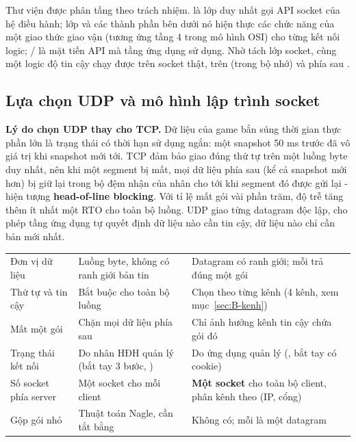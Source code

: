 Thư viện được phân tầng theo trách nhiệm.  là lớp duy nhất gọi API socket của hệ điều hành; lớp
 và các thành phần bên dưới nó hiện thực các chức năng của một giao thức giao vận (tương ứng tầng 4
trong mô hình OSI) cho từng kết nối logic; / là mặt tiền API mà tầng
ứng dụng sử dụng. Nhờ tách lớp socket, cùng một logic độ tin cậy chạy được trên socket thật, trên
 (trong bộ nhớ) và phía sau .

\subsection{Lựa chọn UDP và mô hình lập trình socket}
\textbf{Lý do chọn UDP thay cho TCP.} Dữ liệu của game bắn súng thời gian thực phần lớn là trạng thái có thời hạn
sử dụng ngắn: một snapshot 50 ms trước đã vô giá trị khi snapshot mới tới. TCP đảm bảo giao đúng thứ tự trên một luồng
byte duy nhất, nên khi một segment bị mất, mọi dữ liệu phía sau (kể cả snapshot mới hơn) bị giữ lại trong bộ đệm nhận
của nhân cho tới khi segment đó được gửi lại - hiện tượng \textbf{head-of-line blocking}. Với tỉ lệ mất gói vài phần
trăm, độ trễ tăng thêm ít nhất một RTO cho toàn bộ luồng. UDP giao từng datagram độc lập, cho phép tầng ứng dụng tự
quyết định dữ liệu nào cần tin cậy, dữ liệu nào chỉ cần bản mới nhất.

\begin{center}\small
\begin{tabularx}{\linewidth}{|L{3.4cm}|Y|Y|}
\hline
{} &  &  \\ \hline
Đơn vị dữ liệu & Luồng byte, không có ranh giới bản tin & Datagram có ranh giới; mỗi  trả đúng một gói \\ \hline
Thứ tự và tin cậy & Bắt buộc cho toàn bộ luồng & Chọn theo từng kênh (4 kênh, xem mục~\ref{sec:B-kenh}) \\ \hline
Mất một gói & Chặn mọi dữ liệu phía sau & Chỉ ảnh hưởng kênh tin cậy chứa gói đó \\ \hline
Trạng thái kết nối & Do nhân HĐH quản lý (bắt tay 3 bước, ) & Do ứng dụng quản lý (, bắt tay có cookie) \\ \hline
Số socket phía server & Một socket cho mỗi client & \textbf{Một socket} cho toàn bộ client, phân kênh theo (IP, cổng) \\ \hline
Gộp gói nhỏ & Thuật toán Nagle, cần tắt bằng  & Không có; mỗi  là một datagram \\ \hline
\end{tabularx}
\end{center}

